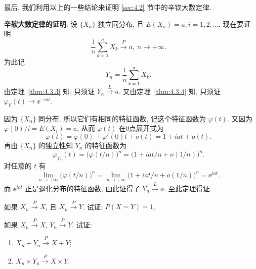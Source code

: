 最后, 我们利用以上的一些结论来证明 \ref{sec:4.2} 节中的辛钦大数定律.

\textbf{辛软大数定律的证明}:
设 $ \{ X_n \} $ 独立同分布, 且 $ E (X_n) = a, i=1, 2, \dotsc $.
现在要证明
\begin{equation*}
    \frac{1}{n} \sum_{k=1}^n X_k \stackrel{P}{\to} a, \ n \to +\infty.
\end{equation*}
为此记
\begin{equation*}
    Y_n = \frac{1}{n} \sum_{k=1}^n X_k.
\end{equation*}
由定理~\ref{thm:4.3.3} 知, 只须证 $ Y_n \stackrel{L}{\to} a $.
又由定理~\ref{thm:4.3.4} 知, 只须证 $ \varphi_Y (t) \to \ee^{-iat} $.

因为 $ \{ X_n \} $ 同分布, 所以它们有相同的特征函数, 记这个特征函数为 $ \varphi (t) $.
又因为 $ \varphi(0) / i = E ( X_i ) = a $, 从而 $ \varphi (t) $ 在0点展开式为
\begin{equation*}
    \varphi (t) = \varphi (0) + \varphi' (0) t + o (t) = 1 + iat + o (t).
\end{equation*}
再由 $ \{ X_n \} $ 的独立性知 $ Y_n $ 的特征函数为
\begin{equation*}
    \varphi_{Y_n} (t) = \bigl( \varphi ( t / n) \bigr)^n = \bigl( 1 + iat/n + o (1/n) \bigr)^n.
\end{equation*}
对任意的 $ t $ 有
\begin{equation*}
    \lim_{n \to +\infty} \bigl( \varphi ( t / n) \bigr)^n = \lim_{n \to +\infty} \bigl( 1 + iat/n + o (1/n) \bigr)^n = \ee^{iat}.
\end{equation*}
而 $ \ee^{iat} $ 正是退化分布的特征函数, 由此证得了 $ Y_n \stackrel{L}{\to} a $.
至此定理得证.

\begin{xiti}
    \item 如果 $ X_n \stackrel{P}{\to} X $, 且 $ X_n \stackrel{P}{\to} Y $. 试证: $ P ( X = Y ) = 1 $.
    \item 如果 $ X_n \stackrel{P}{\to} X $, $ Y_n \stackrel{P}{\to} Y $. 试证:
    \begin{enumerate}
        \item $ X_n + Y_n \stackrel{P}{\to} X + Y $;
        \item $ X_n \times Y_n \stackrel{P}{\to} X \times Y $.
    \end{enumerate}
\end{xiti}

